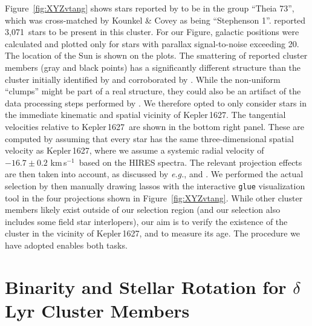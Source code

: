 \documentclass[12pt,modern,twocolumn,tighten]{aastex63}
\newcommand{\sn}{Kepler\,1627} %
\newcommand{\noriginal}{3{,}071} %
\newcommand{\kms}{\,km\,s$^{-1}$}
\begin{document}
Figure~\ref{fig:XYZvtang} shows stars reported by
\citet{kounkel_untangling_2019} to be in the group ``Theia 73'', which
was cross-matched by Kounkel \& Covey as being ``Stephenson 1''.
\citet{kounkel_untangling_2019} reported \noriginal\ stars to be
present in this cluster.  For our Figure, galactic positions were
calculated and plotted only for stars with parallax signal-to-noise
exceeding 20.  The location of the Sun is shown on the plots.  The
smattering of reported cluster members (gray and black points) has a
significantly different structure than the cluster initially
identified by \citet{stephenson_possible_1959} and corroborated by
\citet{eggen_photometric_1968}.  While the non-uniform ``clumps''
might be part of a real structure, they could also be an artifact of
the data processing steps performed by
\citet{kounkel_untangling_2019}.  We therefore opted to only consider
stars in the immediate kinematic and spatial vicinity of \sn.  The
tangential velocities relative to \sn\ are shown in the bottom right
panel.  These are computed by assuming that every star has the same
three-dimensional spatial velocity as \sn, where we assume a systemic
radial velocity of $-16.7 \pm 0.2$\,\kms\ based on the HIRES
spectra.  The
relevant projection effects are then taken into account, as discussed
by {\it e.g.}, \citet{Meingast2021} and \citet{bouma_2021_ngc2516}.
We performed the actual selection by then manually drawing lassos with
the interactive \texttt{glue} visualization tool
\citep{beaumont_2014_13866} in the four projections shown in
Figure~\ref{fig:XYZvtang}.  While other cluster members likely exist
outside of our selection region (and our selection also includes some
field star interlopers), our aim is to verify the existence of the
cluster in the vicinity of Kepler\,1627, and to measure its age.  The
procedure we have adopted enables both tasks.


\section{Binarity and Stellar Rotation for $\delta$\,Lyr Cluster Members}
\label{app:rotationbinarity}
\end{document}
